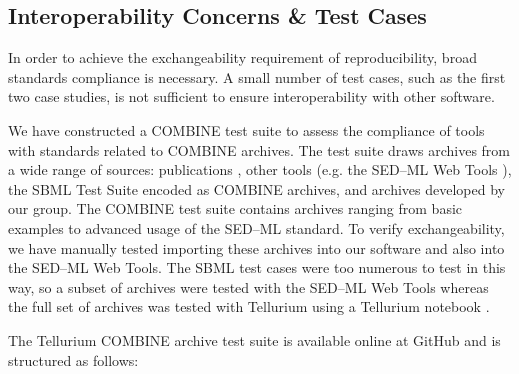 \documentclass[10pt,letterpaper]{article}
\begin{document}
\subsection*{Interoperability Concerns \& Test Cases}

In order to achieve the exchangeability requirement of reproducibility, broad standards compliance is necessary. A small number of test cases, such as the first two case studies, is not sufficient to ensure interoperability with other software.

We have constructed a COMBINE test suite to assess the compliance of tools with standards related to COMBINE archives. The test suite draws archives from a wide range of sources: publications \cite{bergmann2014combine,scharmf1000}, other tools (e.g. the SED--ML Web Tools \cite{bergmann2017sed}), the SBML Test Suite encoded as COMBINE archives, and archives developed by our group. The COMBINE test suite contains archives ranging from basic examples to advanced usage of the SED--ML standard. To verify exchangeability, we have manually tested importing these archives into our software and also into the SED--ML Web Tools. The SBML test cases were too numerous to test in this way, so a subset of archives were tested with the SED--ML Web Tools whereas the full set of archives was tested with Tellurium using a Tellurium notebook \cite{sbmltsnotebook}.

The Tellurium COMBINE archive test suite is available online at GitHub \cite{catests} and is structured as follows:
\end{document}
